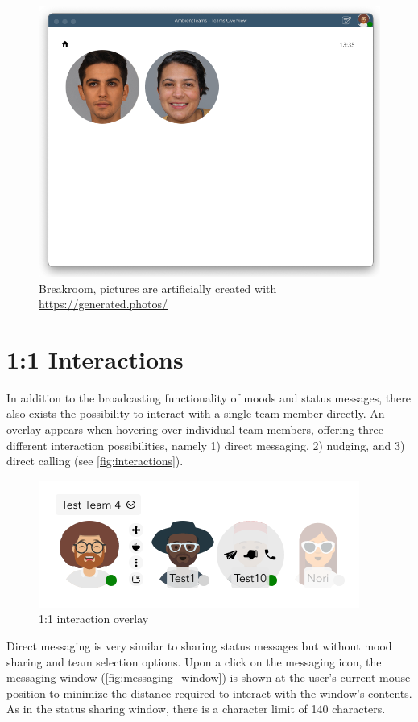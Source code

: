\begin{figure}[h]
    \centering
    \includegraphics[width=.8\linewidth]{./images/breakroom.png}
    \caption{Breakroom, pictures are artificially created with \url{https://generated.photos/}}
    \label{fig:breakroom}
\end{figure}


\section{1:1 Interactions}
In addition to the broadcasting functionality of moods and status messages, there also exists the possibility to interact with a single team member directly. An overlay appears when hovering over individual team members, offering three different interaction possibilities, namely 1) direct messaging, 2) nudging, and 3) direct calling (see \autoref{fig:interactions}).

\begin{figure}[h]
    \centering
    \includegraphics[width=.4\linewidth]{./images/interactions.png}
    \caption{1:1 interaction overlay }
    \label{fig:interactions}
\end{figure}

Direct messaging is very similar to sharing status messages but without mood sharing and team selection options. Upon a click on the messaging icon, the messaging window (\autoref{fig:messaging_window}) is shown at the user's current mouse position to minimize the distance required to interact with the window's contents. As in the status sharing window, there is a character limit of 140 characters.

